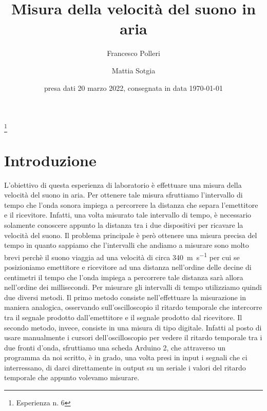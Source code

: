 \documentclass[
    rmp,
    reprint, 
    superscriptaddress, 
    altaffilletter, 
    amsmath, 
    amssymb, 
    a4paper, 
    fleqn]{revtex4-2}
\begin{document}
\title{Misura della velocità del suono in aria
}
\thanks{Esperienza n. 6
}

\author{Francesco Polleri}
\author{Mattia Sotgia}


\date{presa dati
    20 marzo 2022, consegnata in data 
    \today
}

\begin{abstract}

\end{abstract}

\maketitle
\thispagestyle{fancy}




\section{Introduzione}

L'obiettivo di questa esperienza di laboratorio è effettuare una misura della velocità del suono in aria. Per ottenere tale misura sfruttiamo l'intervallo di tempo che l'onda sonora impiega a percorrere la distanza che separa l'emettitore e il ricevitore. Infatti, una volta misurato tale intervallo di tempo, è necessario solamente conoscere appunto la distanza tra i due dispositivi per ricavare la velocità del suono. Il problema principale è però ottenere una misura precisa del tempo in quanto sappiamo che l'intervalli che andiamo a misurare sono molto brevi perchè il suono viaggia ad una velocità di circa \SI{340}{\metre\per\second} per cui se posizioniamo emettitore e ricevitore ad una distanza nell'ordine delle decine di centimetri il tempo che l'onda impiega a percorrere tale distanza sarà allora nell'ordine dei millisecondi. 
Per misurare gli intervalli di tempo utilizziamo quindi due diversi metodi. Il primo metodo consiste nell'effettuare la misurazione in maniera analogica, osservando sull'oscilloscopio il ritardo temporale che intercorre tra il segnale prodotto dall'emettitore e il segnale prodotto dal ricevitore. Il secondo metodo, invece, consiste in una misura di tipo digitale. Infatti al posto di usare manualmente i cursori dell'oscilloscopio per vedere il ritardo temporale tra i due fronti d'onda, sfruttiamo una scheda Arduino 2, che attraverso un programma da noi scritto, è in grado, una volta presi in input i segnali che ci interressano, di darci direttamente in output su un seriale i valori del ritardo temporale che appunto volevamo misurare.  
\end{document}
